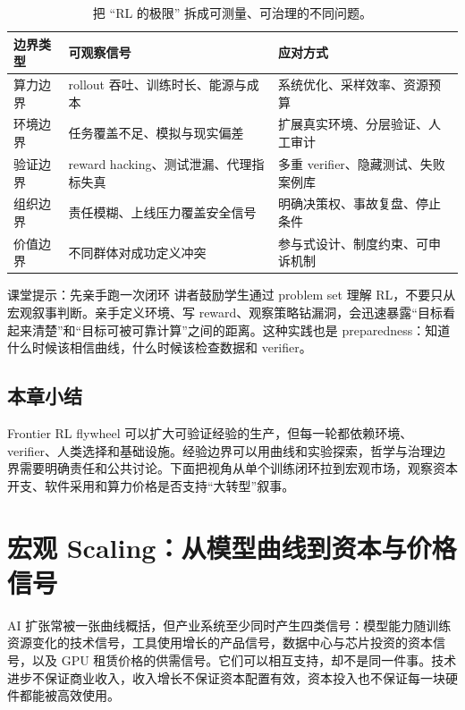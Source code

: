 \documentclass[a4paper]{article}
\begin{document}
\begin{table}[H]
\centering
\begin{tabular}{L{0.2\textwidth}L{0.31\textwidth}L{0.39\textwidth}}
\toprule
边界类型 & 可观察信号 & 应对方式 \\
\midrule
算力边界 & rollout 吞吐、训练时长、能源与成本 & 系统优化、采样效率、资源预算 \\
环境边界 & 任务覆盖不足、模拟与现实偏差 & 扩展真实环境、分层验证、人工审计 \\
验证边界 & reward hacking、测试泄漏、代理指标失真 & 多重 verifier、隐藏测试、失败案例库 \\
组织边界 & 责任模糊、上线压力覆盖安全信号 & 明确决策权、事故复盘、停止条件 \\
价值边界 & 不同群体对成功定义冲突 & 参与式设计、制度约束、可申诉机制 \\
\bottomrule
\end{tabular}
\caption{把 ``RL 的极限'' 拆成可测量、可治理的不同问题。}
\end{table}

\begin{knowledgebox}{课堂提示：先亲手跑一次闭环}
讲者鼓励学生通过 problem set 理解 RL，不要只从宏观叙事判断。亲手定义环境、写 reward、观察策略钻漏洞，会迅速暴露“目标看起来清楚”和“目标可被可靠计算”之间的距离。这种实践也是 preparedness：知道什么时候该相信曲线，什么时候该检查数据和 verifier。
\end{knowledgebox}

\subsection{本章小结}

Frontier RL flywheel 可以扩大可验证经验的生产，但每一轮都依赖环境、verifier、人类选择和基础设施。经验边界可以用曲线和实验探索，哲学与治理边界需要明确责任和公共讨论。下面把视角从单个训练闭环拉到宏观市场，观察资本开支、软件采用和算力价格是否支持“大转型”叙事。

\section{宏观 Scaling：从模型曲线到资本与价格信号}

AI 扩张常被一张曲线概括，但产业系统至少同时产生四类信号：模型能力随训练资源变化的技术信号，工具使用增长的产品信号，数据中心与芯片投资的资本信号，以及 GPU 租赁价格的供需信号。它们可以相互支持，却不是同一件事。技术进步不保证商业收入，收入增长不保证资本配置有效，资本投入也不保证每一块硬件都能被高效使用。
\end{document}
